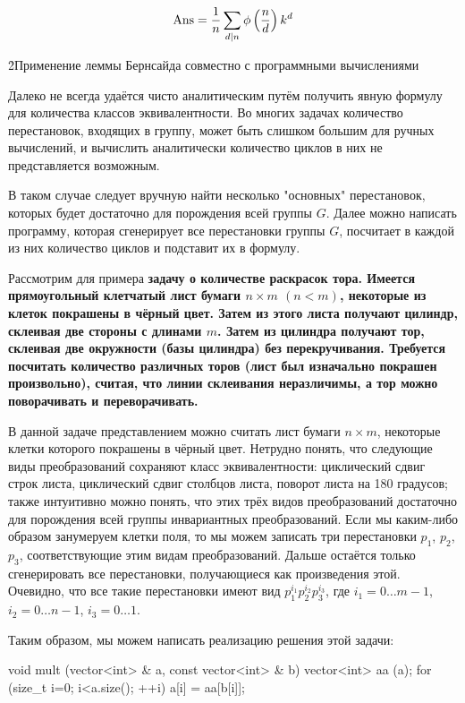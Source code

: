 $$ {\rm Ans} = \frac{1}{n} \sum_{d|n} \phi \left( \frac{n}{d} \right) k^d $$

\h2{Применение леммы Бернсайда совместно с программными вычислениями}

Далеко не всегда удаётся чисто аналитическим путём получить явную формулу для количества классов эквивалентности. Во многих задачах количество перестановок, входящих в группу, может быть слишком большим для ручных вычислений, и вычислить аналитически количество циклов в них не представляется возможным.

В таком случае следует вручную найти несколько "основных" перестановок, которых будет достаточно для порождения всей группы $G$. Далее можно написать программу, которая сгенерирует все перестановки группы $G$, посчитает в каждой из них количество циклов и подставит их в формулу.

Рассмотрим для примера \bf{задачу о количестве раскрасок тора}. Имеется прямоугольный клетчатый лист бумаги $n \times m$ $(n < m)$, некоторые из клеток покрашены в чёрный цвет. Затем из этого листа получают цилиндр, склеивая две стороны с длинами $m$. Затем из цилиндра получают тор, склеивая две окружности (базы цилиндра) без перекручивания. Требуется посчитать количество различных торов (лист был изначально покрашен произвольно), считая, что линии склеивания неразличимы, а тор можно поворачивать и переворачивать.

В данной задаче представлением можно считать лист бумаги $n \times m$, некоторые клетки которого покрашены в чёрный цвет. Нетрудно понять, что следующие виды преобразований сохраняют класс эквивалентности: циклический сдвиг строк листа, циклический сдвиг столбцов листа, поворот листа на 180 градусов; также интуитивно можно понять, что этих трёх видов преобразований достаточно для порождения всей группы инвариантных преобразований. Если мы каким-либо образом занумеруем клетки поля, то мы можем записать три перестановки $p_1$, $p_2$, $p_3$, соответствующие этим видам преобразований. Дальше остаётся только сгенерировать все перестановки, получающиеся как произведения этой. Очевидно, что все такие перестановки имеют вид $p_1^{i_1} p_2^{i_2} p_3^{i_3}$, где $i_1 = 0 \ldots m-1$, $i_2 = 0 \ldots n-1$, $i_3 = 0 \ldots 1$.

Таким образом, мы можем написать реализацию решения этой задачи:

\code
void mult (vector<int> & a, const vector<int> & b) {
	vector<int> aa (a);
	for (size_t i=0; i<a.size(); ++i)
		a[i] = aa[b[i]];
}

